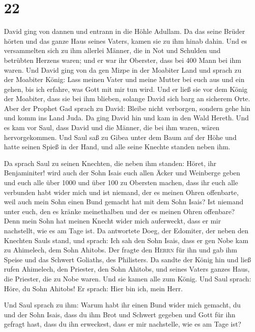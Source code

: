 \hypertarget{section-21}{%
\section{22}\label{section-21}}

 David ging von dannen und entrann in die Höhle Adullam.
Da das seine Brüder hörten und das ganze Haus seines Vaters, kamen sie
zu ihm hinab dahin.  Und es versammelten sich zu ihm
allerlei Männer, die in Not und Schulden und betrübten Herzens waren;
und er war ihr Oberster, dass bei 400 Mann bei ihm waren. 
Und David ging von da gen Mizpe in der Moabiter Land und sprach zu der
Moabiter König: Lass meinen Vater und meine Mutter bei euch aus und ein
gehen, bis ich erfahre, was Gott mit mir tun wird.  Und er
ließ sie vor dem König der Moabiter, dass sie bei ihm blieben, solange
David sich barg an sicherem Orte.  Aber der Prophet Gad
sprach zu David: Bleibe nicht verborgen, sondern gehe hin und komm ins
Land Juda. Da ging David hin und kam in den Wald Hereth. 
Und es kam vor Saul, dass David und die Männer, die bei ihm waren, wären
hervorgekommen. Und Saul saß zu Gibea unter dem Baum auf der Höhe und
hatte seinen Spieß in der Hand, und alle seine Knechte standen neben
ihm.

 Da sprach Saul zu seinen Knechten, die neben ihm standen:
Höret, ihr Benjaminiter! wird auch der Sohn Isais euch allen Äcker und
Weinberge geben und euch alle über 1000 und über 100 zu Obersten machen,
 dass ihr euch alle verbunden habt wider mich und ist
niemand, der es meinen Ohren offenbarte, weil auch mein Sohn einen Bund
gemacht hat mit dem Sohn Isais? Ist niemand unter euch, den es kränke
meinethalben und der es meinen Ohren offenbare? Denn mein Sohn hat
meinen Knecht wider mich auferweckt, dass er mir nachstellt, wie es am
Tage ist.  Da antwortete Doeg, der Edomiter, der neben den
Knechten Sauls stand, und sprach: Ich sah den Sohn Isais, dass er gen
Nobe kam zu Ahimelech, dem Sohn Ahitobs.  Der fragte den
\textsc{Herrn} für ihn und gab ihm Speise und das Schwert Goliaths, des
Philisters.  Da sandte der König hin und ließ rufen
Ahimelech, den Priester, den Sohn Ahitobs, und seines Vaters ganzes
Haus, die Priester, die zu Nobe waren. Und sie kamen alle zum König.
 Und Saul sprach: Höre, du Sohn Ahitobs! Er sprach: Hier
bin ich, mein Herr.

 Und Saul sprach zu ihm: Warum habt ihr einen Bund wider
mich gemacht, du und der Sohn Isais, dass du ihm Brot und Schwert
gegeben und Gott für ihn gefragt hast, dass du ihn erweckest, dass er
mir nachstelle, wie es am Tage ist?

